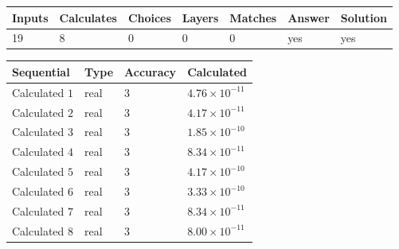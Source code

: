 \documentclass[12pt]{article}
\begin{document}
 

 
\vspace{0.3in}
   
   
   
   
\noindent\begin{tabular}{|l|l|l|l|l|l|l|}
 \hline
Inputs & Calculates & Choices & Layers & Matches & Answer & Solution \\ \hline
          19  & 
           8  & 
           0
  & 
           0  & 
           0  & 
  yes & 
  yes 
  \\ \hline
 \end{tabular}
   
   
   
   
\noindent{}
   
   
  
  
\noindent\begin{tabular}{|l|l|l|l|}
\hline
 Sequential & Type & Accuracy & Calculated \\ 
\hline
 
 
  Calculated $            1 $ & real & $            3  $ & 
 $ 4.76 \times 10^{-11} $ 
 \\  \hline  
 
 
  Calculated $            2 $ & real & $            3  $ & 
 $ 4.17 \times 10^{-11} $ 
 \\  \hline  
 
 
  Calculated $            3 $ & real & $            3  $ & 
 $ 1.85 \times 10^{-10} $ 
 \\  \hline  
 
 
  Calculated $            4 $ & real & $            3  $ & 
 $ 8.34 \times 10^{-11} $ 
 \\  \hline  
 
 
  Calculated $            5 $ & real & $            3  $ & 
 $ 4.17 \times 10^{-10} $ 
 \\  \hline  
 
 
  Calculated $            6 $ & real & $            3  $ & 
 $ 3.33 \times 10^{-10} $ 
 \\  \hline  
 
 
  Calculated $            7 $ & real & $            3  $ & 
 $ 8.34 \times 10^{-11} $ 
 \\  \hline  
 
 
  Calculated $            8 $ & real & $            3  $ & 
 $ 8.00 \times 10^{-11} $ 
 \\  \hline  
 \end{tabular}
   
\end{document}
